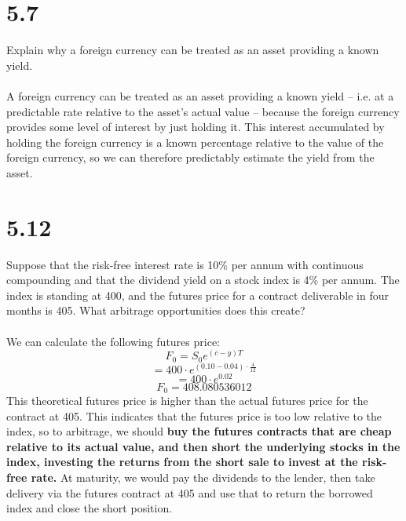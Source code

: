\documentclass{article}
\begin{document}
{\Large 

\section*{5.7}
Explain why a foreign currency can be treated as an asset providing a known yield. \\ \\
A foreign currency can be treated as an asset providing a known yield -- i.e. at a predictable rate relative to the asset's actual value -- because the foreign currency provides some level of interest by just holding it. This interest accumulated by holding the foreign currency is a known percentage relative to the value of the foreign currency, so we can therefore predictably estimate the yield from the asset. 

}
{\Large 

\section*{5.12}
Suppose that the risk-free interest rate is 10\% per annum with continuous compounding and that the dividend yield on a stock index is 4\% per annum. The index is standing at 400, and the futures price for a contract deliverable in four months is 405. What arbitrage opportunities does this create? \\ \\
We can calculate the following futures price:
\[
  F_0 = S_0 e^{(c-y)T}
\]
\[
  = 400 \cdot e^{(0.10 - 0.04) \cdot \frac{4}{12}}
\]
\[
  = 400 \cdot e^{0.02}
\]
\[
  F_0 = 408.080536012
\]
This theoretical futures price is higher than the actual futures price for the contract at 405. This indicates that the futures price is too low relative to the index, so to arbitrage, we should \textbf{buy the futures contracts that are cheap relative to its actual value, and then short the underlying stocks in the index, investing the returns from the short sale to invest at the risk-free rate.} At maturity, we would pay the dividends to the lender, then take delivery via the futures contract at 405 and use that to return the borrowed index and close the short position. 

}
\end{document}
